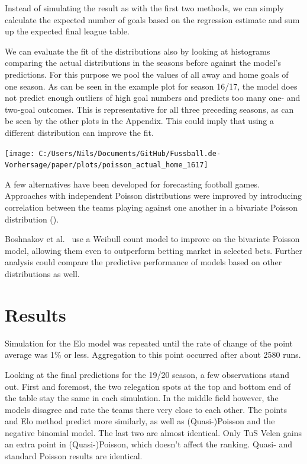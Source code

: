 \documentclass[12pt,a4paper]{article}
\begin{document}
Instead of simulating the result as with the first two methods, we can
simply calculate the expected number of goals based on the regression
estimate and sum up the expected final league table.

We can evaluate the fit of the distributions also by looking at
histograms comparing the actual distributions in the seasons before
against the model's predictions. For this purpose we pool the values of
all away and home goals of one season. As can be seen in the example
plot for season 16/17, the model does not predict enough outliers of
high goal numbers and predicts too many one- and two-goal outcomes. This
is representative for all three preceding seasons, as can be seen by the
other plots in the Appendix. This could imply that using a different
distribution can improve the fit.

\texttt{[image: C:/Users/Nils/Documents/GitHub/Fussball.de-Vorhersage/paper/plots/poisson\_actual\_home\_1617]}

A few alternatives have been developed for forecasting football games.
Approaches with independent Poisson distributions were improved by
introducing correlation between the teams playing against one another in
a bivariate Poisson distribution (\textcite{karlis2003}).

Boshnakov et al.~\autocite*{boshnakov2016} use a Weibull count model to
improve on the bivariate Poisson model, allowing them even to outperform
betting market in selected bets. Further analysis could compare the
predictive performance of models based on other distributions as well.

\hypertarget{results}{%
\section{Results}\label{results}}

Simulation for the Elo model was repeated until the rate of change of
the point average was 1\% or less. Aggregation to this point occurred
after about 2580 runs.

Looking at the final predictions for the 19/20 season, a few
observations stand out. First and foremost, the two relegation spots at
the top and bottom end of the table stay the same in each simulation. In
the middle field however, the models disagree and rate the teams there
very close to each other. The points and Elo method predict more
similarly, as well as (Quasi-)Poisson and the negative binomial model.
The last two are almost identical. Only TuS Velen gains an extra point
in (Quasi-)Poisson, which doesn't affect the ranking. Quasi- and
standard Poisson results are identical.
\end{document}
